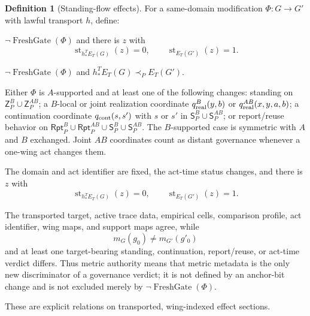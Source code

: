 \documentclass[11pt]{article}
\theoremstyle{definition}
\newtheorem{definition}[theorem]{Definition}
\newcommand{\Bell}{\mathcal{B}}
\newcommand{\CreatesStand}{\mathrm{CreatesStand}_{\Bell}}
\newcommand{\AmplifiesStand}{\mathrm{AmplifiesStand}_{\Bell}}
\newcommand{\TransfersStand}{\mathrm{TransfersStand}_{\Bell}}
\newcommand{\RepairsAct}{\mathrm{RepairsSameAct}_{\Bell}}
\newcommand{\MetricAuth}{\mathrm{MetricAuthorizes}_{\Bell}}
\begin{document}
\begin{definition}[Standing-flow effects]\label{def:standingflow}
For a same-domain modification $\Phi:G\to G'$ with lawful transport $h$, define:
\begin{description}[leftmargin=3.0em,style=nextline]
\item[$\CreatesStand(\Phi)$]
$\neg\operatorname{FreshGate}(\Phi)$ and there is $z$ with
\[
\operatorname{st}_{h_*^TE_T(G)}(z)=0,
\qquad
\operatorname{st}_{E_T(G')}(z)=1.
\]
\item[$\AmplifiesStand(\Phi)$]
$\neg\operatorname{FreshGate}(\Phi)$ and $h_*^TE_T(G)\prec_P E_T(G')$.
\item[$\TransfersStand(\Phi)$]
Either $\Phi$ is $A$-supported and at least one of the following changes: standing on $\mathsf Z_P^B\cup\mathsf Z_P^{AB}$; a $B$-local or joint realization coordinate $q^B_{\rm real}(y,b)$ or $q^{AB}_{\rm real}(x,y,a,b)$; a continuation coordinate $q_{\rm cont}(s,s')$ with $s$ or $s'$ in $\mathsf S_P^B\cup\mathsf S_P^{AB}$; or report/reuse behavior on $\mathsf{Rpt}_P^B\cup\mathsf{Rpt}_P^{AB}\cup\mathsf S_P^B\cup\mathsf S_P^{AB}$. The $B$-supported case is symmetric with $A$ and $B$ exchanged. Joint $AB$ coordinates count as distant governance whenever a one-wing act changes them.
\item[$\RepairsAct(\Phi)$]
The domain and act identifier are fixed, the act-time status changes, and there is $z$ with
\[
\operatorname{st}_{h_*^TE_T(G)}(z)=0,
\qquad
\operatorname{st}_{E_T(G')}(z)=1.
\]
\item[$\MetricAuth(\Phi)$]
The transported target, active trace data, empirical cells, comparison profile, act identifier, wing maps, and support maps agree, while
\[
m_G(g_0)\neq m_{G'}(g'_0)
\]
and at least one target-bearing standing, continuation, report/reuse, or act-time verdict differs. Thus metric authority means that metric metadata is the only new discriminator of a governance verdict; it is not defined by an anchor-bit change and is not excluded merely by $\neg\operatorname{FreshGate}(\Phi)$.
\end{description}
These are explicit relations on transported, wing-indexed effect sections.
\end{definition}
\end{document}
